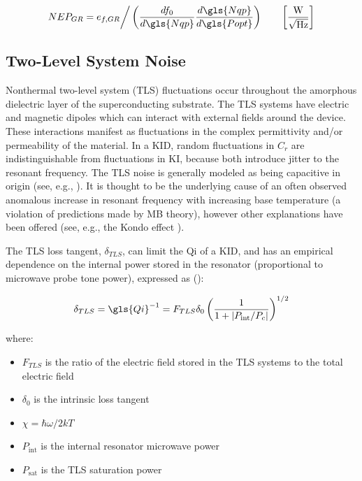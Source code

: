 \begin{equation} \label{eq:NEP GR}
  NEP_{GR} = e_{f,GR} \bigg/ \left( \frac{df_{0}}{d\gls{Nqp}}\frac{d\gls{Nqp}}{d\gls{Popt}} \right) \qquad \left[ \frac{\mathrm{W}}{\sqrt{\mathrm{Hz}}} \right]
\end{equation}

\subsection{Two-Level System Noise}\label{ssec:TLS}

Nonthermal two-level system (TLS) fluctuations occur throughout the amorphous dielectric layer of the superconducting substrate. The TLS systems have electric and magnetic dipoles which can interact with external fields around the device. These interactions manifest as fluctuations in the complex permittivity and/or permeability of the material. In a KID, random fluctuations in $C_{r}$ are indistinguishable from fluctuations in KI, because both introduce jitter to the resonant frequency. The TLS noise is generally modeled as being capacitive in origin (see, e.g., \citet{gao2008physics,zmuidzinas2012superconducting}). It is thought to be the underlying cause of an often observed anomalous increase in resonant frequency with increasing base temperature (a violation of predictions made by MB theory), however other explanations have been offered (see, e.g., the Kondo effect \citep{noguchi2018analysis}).

The TLS loss tangent, $\delta_{TLS}$, can limit the \gls{Qi} of a KID, and has an empirical dependence on the internal power stored in the resonator (proportional to microwave probe tone power), expressed as (\citet{barry2014development,martinis2005decoherence}):

\begin{equation}
  \delta_{TLS} = \gls{Qi}^{-1} = F_{TLS}\delta_{0} \left(\frac{1}{1 + \left| P_{\mathrm{int}}/P_{c} \right|} \right)^{1/2}
\end{equation}

where:
\begin{itemize}[label={},nosep]
  \item $F_{TLS}$ is the ratio of the electric field stored in the TLS systems to the total electric field
  \item $\delta_{0}$ is the intrinsic loss tangent
  \item $\chi = \hbar\omega/2kT$
  \item $P_{\mathrm{int}}$ is the internal resonator microwave power
  \item $P_{\mathrm{sat}}$ is the TLS saturation power
\end{itemize}

